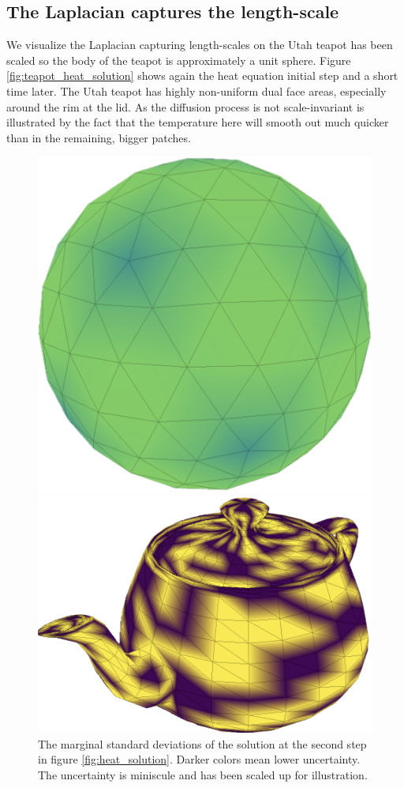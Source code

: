 \subsection*{The Laplacian captures the length-scale}
We visualize the Laplacian capturing length-scales on the Utah teapot \cite{utah} has been scaled so the body of the teapot is approximately a unit sphere. Figure \ref{fig:teapot_heat_solution} shows again the heat equation initial step and a short time later. The Utah teapot has highly non-uniform dual face areas, especially around the rim at the lid. As the diffusion process is not scale-invariant is illustrated by the fact that the temperature here will smooth out much quicker than in the remaining, bigger patches.
\begin{figure}
    \centering
    \includegraphics[width=0.9\columnwidth]{../images/sphere_uncertainty.png}\vspace*{3mm}
    \caption{The marginal standard deviations of the solution at the second step in figure \ref{fig:heat_solution}. Darker colors mean lower uncertainty. The uncertainty is miniscule and has been scaled up for illustration.}
    \label{fig:heat_uncertainty}
    \vspace*{10mm}
    \includegraphics[width=0.9\columnwidth]{../images/teapot_entropic.png}\vspace*{3mm}

\end{figure}

